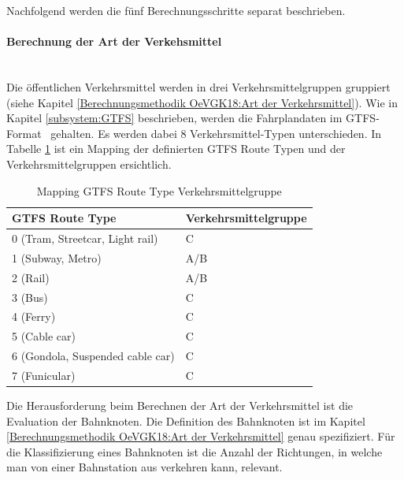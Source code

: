 Nachfolgend werden die fünf Berechnungsschritte separat beschrieben.

\paragraph{Berechnung der Art der Verkehsmittel}~\\
Die öffentlichen Verkehrsmittel werden in drei Verkehrsmittelgruppen gruppiert (siehe Kapitel \ref{Berechnungsmethodik OeVGK18:Art der Verkehrsmittel}).
Wie in Kapitel \ref{subsystem:GTFS} beschrieben, werden die Fahrplandaten im \acs{GTFS}-Format~\cite{gtfs_spec} gehalten. 
Es werden dabei 8 Verkehrsmittel-Typen unterschieden.
In Tabelle \ref{table:Mapping GTFS Route Type Verkehrsmittelgruppe} ist ein Mapping der definierten GTFS Route Typen und der Verkehrsmittelgruppen ersichtlich.

\begin{table}[ht]
    \centering
    \begin{tabular}[ht]{l l}
        \toprule
        \textbf{GTFS Route Type} 
                                & \textbf{Verkehrsmittelgruppe}\\
        \midrule
        0 (Tram, Streetcar, Light rail)
                                & C\\
        1 (Subway, Metro)
                                & A/B\\
        2 (Rail)
                                & A/B\\
        3 (Bus)
                                & C\\
        4 (Ferry)
                                & C\\
        5 (Cable car)
                                & C\\
        6 (Gondola, Suspended cable car)
                                & C\\
        7 (Funicular)
                                & C\\            
        \bottomrule
    \end{tabular}
    \caption{Mapping GTFS Route Type Verkehrsmittelgruppe}
    \label{table:Mapping GTFS Route Type Verkehrsmittelgruppe}
\end{table}

Die Herausforderung beim Berechnen der Art der Verkehrsmittel ist die Evaluation der Bahnknoten.
Die Definition des Bahnknoten ist im Kapitel \ref{Berechnungsmethodik OeVGK18:Art der Verkehrsmittel} genau spezifiziert.
Für die Klassifizierung eines Bahnknoten ist die Anzahl der Richtungen, in welche man von einer Bahnstation aus verkehren kann, relevant.

